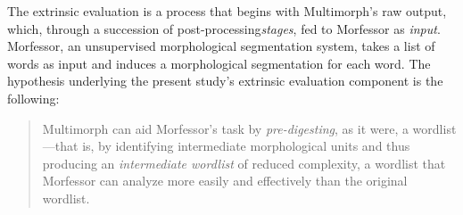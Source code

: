  



The extrinsic evaluation is a process that begins with Multimorph's raw output, which, through a succession of post-processing\emph{stages}, fed to Morfessor as \emph{input}. Morfessor, an unsupervised morphological segmentation system, takes a list of words as input and induces a morphological segmentation for each word. The hypothesis underlying the present study's extrinsic evaluation component is the following:

\begin{quotation}\noindent
Multimorph can aid Morfessor's task by \emph{pre-digesting}, as it were, a wordlist---that is, by identifying intermediate morphological units and thus producing an \emph{intermediate wordlist} of reduced complexity, a wordlist that Morfessor can analyze more easily and effectively than the original wordlist.
\end{quotation}

